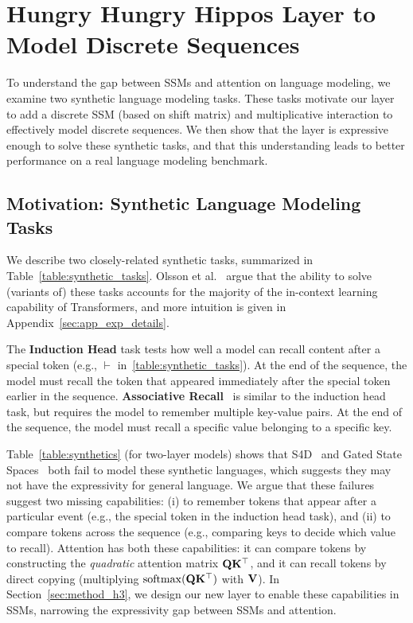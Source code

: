 
\section{Hungry Hungry Hippos Layer to Model Discrete Sequences}
\label{sec:method}

To understand the gap between SSMs and attention on language modeling, we
examine two synthetic language modeling tasks.
These tasks motivate our \hthree layer to add a discrete SSM (based on shift matrix) and multiplicative interaction to effectively model discrete sequences.
We then show that the \hthree layer is expressive enough to solve these synthetic tasks, and that this understanding leads to better performance on a real language modeling benchmark.

\subsection{Motivation: Synthetic Language Modeling Tasks\label{sec:synthetics}}

We describe two closely-related synthetic tasks, summarized in Table~\ref{table:synthetic_tasks}. 
Olsson et al.~\citep{olsson2022context} argue that the ability to solve (variants of) these tasks accounts for the majority of the in-context learning capability of Transformers, and more intuition is given in Appendix~\ref{sec:app_exp_details}. 


The \textbf{Induction Head} task tests how well a model can recall content after a special token (e.g., $\vdash$ in~\cref{table:synthetic_tasks}).
At the end of the sequence, the model must recall the token that appeared immediately after the special token earlier in the sequence. \textbf{Associative Recall}~\citep{ba2016using} is similar to the induction head task, but requires the model to remember multiple key-value pairs.
At the end of the sequence, the model must recall a specific value belonging to a specific key.

Table~\ref{table:synthetics} (for two-layer models) shows that S4D~\citep{gu2022parameterization} and Gated State Spaces~\citep{mehta2022long} both fail to model these synthetic languages, which suggests they may not have the expressivity for general language.
We argue that these failures suggest two missing capabilities: (i) to remember tokens that appear after a particular event (e.g., the special token in the induction head task), and (ii) to compare tokens across the sequence (e.g., comparing keys to decide which value to recall).
Attention has both these capabilities: it can compare tokens by constructing the \textit{quadratic} attention matrix $\mathbf{Q} \mathbf{K}^\top$, and it can recall tokens by direct copying (multiplying $\mathrm{softmax}(\mathbf{Q} \mathbf{K}^\top)$ with $\mathbf{V}$).
In Section~\ref{sec:method_h3}, we design our new layer \hthree to enable these capabilities in SSMs, narrowing the expressivity gap between SSMs and attention.

